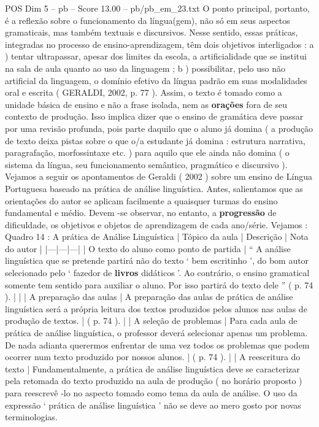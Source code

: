 \begin{textsample}{POS Dim 5 – pb – Score 13.00 – pb/pb\_em\_23.txt}
O ponto principal, portanto, é a reflexão sobre o funcionamento da língua(gem), não só em seus aspectos gramaticais, mas também textuais e discursivos.
Nesse sentido, essas práticas, integradas no processo de ensino-aprendizagem, têm dois objetivos interligados : a ) tentar ultrapassar, apesar dos limites da escola, a artificialidade que se institui na sala de aula quanto ao uso da linguagem ; b ) possibilitar, pelo uso não artificial da linguagem, o domínio efetivo da língua padrão em suas modalidades oral e escrita ( GERALDI, 2002, p. 77 ).
Assim, o texto é tomado como a unidade básica de ensino e não a frase isolada, nem as \textbf{orações} fora de seu contexto de produção.
Isso implica dizer que o ensino de gramática deve passar por uma revisão profunda, pois parte daquilo que o aluno já domina ( a produção de texto deixa pistas sobre o que o/a estudante já domina : estrutura narrativa, paragrafação, morfossintaxe etc. ) para aquilo que ele ainda não domina ( o sistema da língua, seu funcionamento semântico, pragmático e discursivo ).
Vejamos a seguir os apontamentos de Geraldi ( 2002 ) sobre um ensino de Língua Portuguesa baseado na prática de análise linguística.
Antes, salientamos que as orientações do autor se aplicam facilmente a quaisquer turmas do ensino fundamental e médio.
Devem -se observar, no entanto, a \textbf{progressão} de dificuldade, os objetivos e objetos de aprendizagem de cada ano/série.
Vejamos : Quadro 14 : A prática de Análise Linguística | Tópico da aula | Descrição | Nota do autor | |---|---|---| | O texto do aluno como ponto de partida | “ A análise linguística que se pretende partirá não do texto ‘ bem escritinho ’, do bom autor selecionado pelo ‘ fazedor de \textbf{livros} didáticos ’.
Ao contrário, o ensino gramatical somente tem sentido para auxiliar o aluno.
Por isso partirá do texto dele ” ( p. 74 ). | | | A preparação das aulas | A preparação das aulas de prática de análise linguística será a própria leitura dos textos produzidos pelos alunos nas aulas de produção de textos. | ( p. 74 ). | | A seleção de problemas | Para cada aula de prática de análise linguística, o professor deverá selecionar apenas um problema.
De nada adianta querermos enfrentar de uma vez todos os problemas que podem ocorrer num texto produzido por nossos alunos. | ( p. 74 ). | | A reescritura do texto | Fundamentalmente, a prática de análise linguística deve se caracterizar pela retomada do texto produzido na aula de produção ( no horário proposto ) para reescrevê -lo no aspecto tomado como tema da aula de análise.
O uso da expressão ‘ prática de análise linguística ’ não se deve ao mero gosto por novas terminologias.

\end{textsample}
